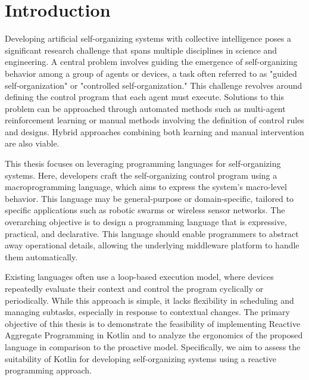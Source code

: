 
\chapter{Introduction}
\label{chap:introduction}

Developing artificial self-organizing systems with collective intelligence poses a significant research challenge that spans multiple disciplines in science and engineering. A central problem involves guiding the emergence of self-organizing behavior among a group of agents or devices, a task often referred to as "guided self-organization" or "controlled self-organization." This challenge revolves around defining the control program that each agent must execute. Solutions to this problem can be approached through automated methods such as multi-agent reinforcement learning or manual methods involving the definition of control rules and designs. Hybrid approaches combining both learning and manual intervention are also viable.

This thesis focuses on leveraging programming languages for self-organizing systems. Here, developers craft the self-organizing control program using a macroprogramming language, which aims to express the system's macro-level behavior. This language may be general-purpose or domain-specific, tailored to specific applications such as robotic swarms or wireless sensor networks. The overarching objective is to design a programming language that is expressive, practical, and declarative. This language should enable programmers to abstract away operational details, allowing the underlying middleware platform to handle them automatically.

Existing languages often use a loop-based execution model, where devices repeatedly evaluate their context and control the program cyclically or periodically. While this approach is simple, it lacks flexibility in scheduling and managing subtasks, especially in response to contextual changes. The primary objective of this thesis is to demonstrate the feasibility of implementing Reactive Aggregate Programming in Kotlin and to analyze the ergonomics of the proposed language in comparison to the proactive model. Specifically, we aim to assess the suitability of Kotlin for developing self-organizing systems using a reactive programming approach.

